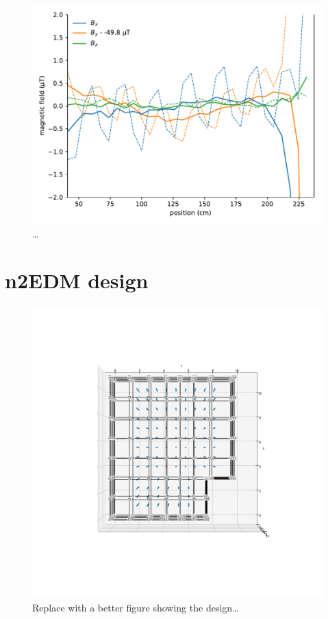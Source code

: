 \begin{figure}
  \centering
  \includegraphics[width=0.7\linewidth]{gfx/prototype/open_planar_map_Y_By_section.pdf}
  \caption{\ldots}
  \label{fig:prototype_open_design_Ycoil_map_section}
\end{figure}

\section{n2EDM design}

\begin{figure}
  \centering
  \includegraphics[width=\linewidth]{gfx/prototype/n2EDM_system_top.png}
  \caption{Replace with a better figure showing the design\ldots}
  \label{fig:prototype_open_design_Xcoil_coils}
\end{figure}

